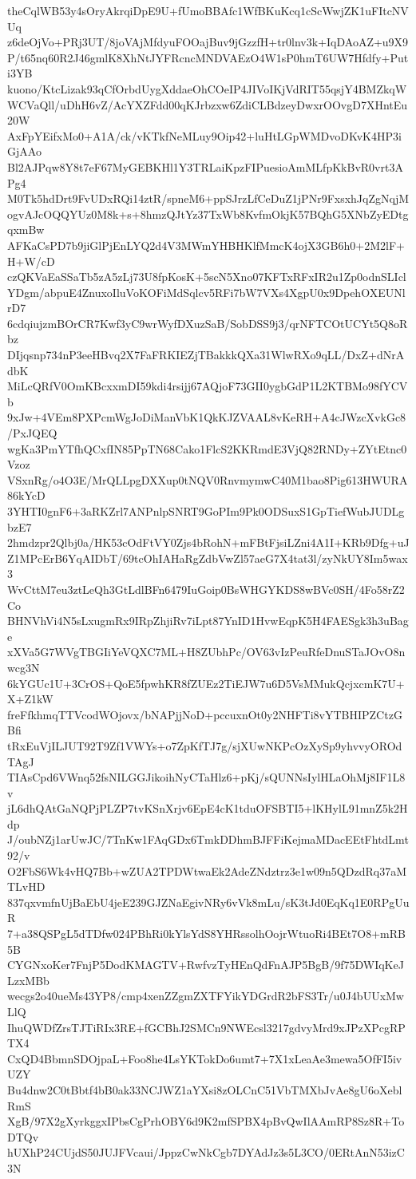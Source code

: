 theCqlWB53y4sOryAkrqiDpE9U+fUmoBBAfc1WfBKuKcq1cScWwjZK1uFItcNVUq
z6deOjVo+PRj3UT/8joVAjMfdyuFOOajBuv9jGzzfH+tr0lnv3k+IqDAoAZ+u9X9
P/t65nq60R2J46gmlK8XhNtJYFRcncMNDVAEzO4W1sP0hmT6UW7Hfdfy+Puti3YB
kuono/KtcLizak93qCfOrbdUygXddaeOhCOeIP4JIVoIKjVdRIT55qsjY4BMZkqW
WCVaQll/uDhH6vZ/AcYXZFdd00qKJrbzxw6ZdiCLBdzeyDwxrOOvgD7XHntEu20W
AxFpYEifxMo0+A1A/ck/vKTkfNeMLuy9Oip42+luHtLGpWMDvoDKvK4HP3iGjAAo
Bl2AJPqw8Y8t7eF67MyGEBKHl1Y3TRLaiKpzFIPuesioAmMLfpKkBvR0vrt3APg4
M0Tk5hdDrt9FvUDxRQi14ztR/spneM6+ppSJrzLfCeDuZ1jPNr9FxsxhJqZgNqjM
ogvAJcOQQYUz0M8k+s+8hmzQJtYz37TxWb8KvfmOkjK57BQhG5XNbZyEDtgqxmBw
AFKaCsPD7b9jiGlPjEnLYQ2d4V3MWmYHBHKlfMmcK4ojX3GB6h0+2M2lF+H+W/cD
czQKVaEaSSaTb5zA5zLj73U8fpKosK+5scN5Xno07KFTxRFxIR2u1Zp0odnSLIcl
YDgm/abpuE4ZnuxoIluVoKOFiMdSqlcv5RFi7bW7VXs4XgpU0x9DpehOXEUNlrD7
6cdqiujzmBOrCR7Kwf3yC9wrWyfDXuzSaB/SobDSS9j3/qrNFTCOtUCYt5Q8oRbz
DIjqsnp734nP3eeHBvq2X7FaFRKIEZjTBakkkQXa31WlwRXo9qLL/DxZ+dNrAdbK
MiLcQRfV0OmKBcxxmDI59kdi4rsijj67AQjoF73GII0ygbGdP1L2KTBMo98fYCVb
9xJw+4VEm8PXPcmWgJoDiManVbK1QkKJZVAAL8vKeRH+A4cJWzcXvkGc8/PxJQEQ
wgKa3PmYTfhQCxfIN85PpTN68Cako1FlcS2KKRmdE3VjQ82RNDy+ZYtEtnc0Vzoz
VSxnRg/o4O3E/MrQLLpgDXXup0tNQV0RnvmymwC40M1bao8Pig613HWURA86kYcD
3YHTI0gnF6+3aRKZrl7ANPnlpSNRT9GoPIm9Pk0ODSuxS1GpTiefWubJUDLgbzE7
2hmdzpr2Qlbj0a/HK53cOdFtVY0Zjs4bRohN+mFBtFjsiLZni4A1I+KRb9Dfg+uJ
Z1MPcErB6YqAIDbT/69tcOhIAHaRgZdbVwZl57aeG7X4tat3l/zyNkUY8Im5wax3
WvCttM7eu3ztLeQh3GtLdlBFn6479IuGoip0BsWHGYKDS8wBVc0SH/4Fo58rZ2Co
BHNVhVi4N5sLxugmRx9IRpZhjiRv7iLpt87YnID1HvwEqpK5H4FAESgk3h3uBage
xXVa5G7WVgTBGIiYeVQXC7ML+H8ZUbhPc/OV63vIzPeuRfeDnuSTaJOvO8nwcg3N
6kYGUc1U+3CrOS+QoE5fpwhKR8fZUEz2TiEJW7u6D5VsMMukQcjxcmK7U+X+Z1kW
freFfkhmqTTVcodWOjovx/bNAPjjNoD+pccuxnOt0y2NHFTi8vYTBHIPZCtzGBfi
tRxEuVjILJUT92T9Zf1VWYs+o7ZpKfTJ7g/sjXUwNKPcOzXySp9yhvvyOROdTAgJ
TIAsCpd6VWnq52fsNILGGJikoihNyCTaHlz6+pKj/sQUNNsIylHLaOhMj8IF1L8v
jL6dhQAtGaNQPjPLZP7tvKSnXrjv6EpE4cK1tduOFSBTI5+lKHylL91mnZ5k2Hdp
J/oubNZj1arUwJC/7TnKw1FAqGDx6TmkDDhmBJFFiKejmaMDacEEtFhtdLmt92/v
O2FbS6Wk4vHQ7Bb+wZUA2TPDWtwaEk2AdeZNdztrz3e1w09n5QDzdRq37aMTLvHD
837qxvmfnUjBaEbU4jeE239GJZNaEgivNRy6vVk8mLu/sK3tJd0EqKq1E0RPgUuR
7+a38QSPgL5dTDfw024PBhRi0kYlsYdS8YHRssolhOojrWtuoRi4BEt7O8+mRB5B
CYGNxoKer7FnjP5DodKMAGTV+RwfvzTyHEnQdFnAJP5BgB/9f75DWIqKeJLzxMBb
wecgs2o40ueMs43YP8/cmp4xenZZgmZXTFYikYDGrdR2bFS3Tr/u0J4bUUxMwLlQ
IhuQWDfZrsTJTiRIx3RE+fGCBhJ2SMCn9NWEcsl3217gdvyMrd9xJPzXPcgRPTX4
CxQD4BbmnSDOjpaL+Foo8he4LsYKTokDo6umt7+7X1xLeaAe3mewa5OfFI5ivUZY
Bu4dnw2C0tBbtf4bB0ak33NCJWZ1aYXsi8zOLCnC51VbTMXbJvAe8gU6oXeblRmS
XgB/97X2gXyrkggxIPbsCgPrhOBY6d9K2mfSPBX4pBvQwIlAAmRP8Sz8R+ToDTQv
hUXhP24CUjdS50JUJFVcaui/JppzCwNkCgb7DYAdJz3s5L3CO/0ERtAnN53izC3N

